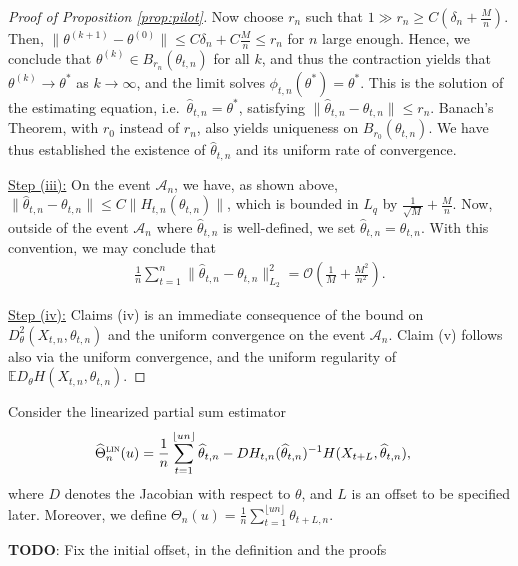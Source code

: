 \documentclass[10pt, a4paper]{article}
\theoremstyle{assumption}
\theoremstyle{definition}
\theoremstyle{theorem}
\newcommand{\E}{\mathbb{E}}
\begin{document}
\begin{proof}[Proof of Proposition \ref{prop:pilot}]
    Now choose $r_n$ such that $1\gg r_n \geq C(\delta_n + \frac{M}{n})$.
    Then, $\|\theta^{(k+1)} - \theta^{(0)}\|\leq C \delta_n + C\frac{M}{n}\leq r_n$ for $n$ large enough. 
    Hence, we conclude that $\theta^{(k)}\in B_{r_n}(\theta_{t,n})$ for all $k$, and thus the contraction yields that $\theta^{(k)}\to \theta^*$ as $k\to \infty$, and the limit solves $\phi_{t,n}(\theta^*)=\theta^*$.
    This is the solution of the estimating equation, i.e.\ $\widehat{\theta}_{t,n}=\theta^*$, satisfying $\|\widehat{\theta}_{t,n}-\theta_{t,n}\|\leq r_n$. 
    Banach's Theorem, with $r_0$ instead of $r_n$, also yields uniqueness on $B_{r_0}(\theta_{t,n})$.
    We have thus established the existence of $\widehat{\theta}_{t,n}$ and its uniform rate of convergence.

    \underline{Step (iii):}
    On the event $\mathcal{A}_n$, we have, as shown above, $\|\widehat{\theta}_{t,n}-\theta_{t,n}\| \leq C \| H_{t,n}(\theta_{t,n})\|$, which is bounded in $L_q$ by $\frac{1}{\sqrt{M}} + \frac{M}{n}$.
    Now, outside of the event $\mathcal{A}_n$ where $\widehat{\theta}_{t,n}$ is well-defined, we set $\widehat{\theta}_{t,n}=\theta_{t,n}$.
    With this convention, we may conclude that
    \begin{align*}
        \frac{1}{n}\sum_{t=1}^n \|\widehat{\theta}_{t,n}-\theta_{t,n}\|_{L_2}^2 = \mathcal{O}\left( \tfrac{1}{M} + \tfrac{M^2}{n^2} \right).
    \end{align*}
    
    \underline{Step (iv):}
    Claims (iv) is an immediate consequence of the bound on $D^2_\theta(X_{t,n}, \theta_{t,n})$ and the uniform convergence on the event $\mathcal{A}_n$. 
    Claim (v) follows also via the uniform convergence, and the uniform regularity of $\E D_\theta H(X_{t,n}, \theta_{t,n})$.
\end{proof}

Consider the linearized partial sum estimator
\begin{align*}
    \widehat{\Theta}_n^{\textsc{lin}}(u)
    &=\frac{1}{n} \sum_{t=1}^{\lfloor un \rfloor} \widehat{\theta}_{t,n} - DH_{t,n}(\widehat{\theta}_{t,n})^{-1} H(X_{t+L}, \widehat{\theta}_{t,n}) ,
\end{align*}
where $D$ denotes the Jacobian with respect to $\theta$, and $L$ is an offset to be specified later. 
Moreover, we define $\Theta_{n}(u) = \frac{1}{n} \sum_{t=1}^{\lfloor un\rfloor} \theta_{t+L,n}$.

\color{blue} \textbf{TODO}: Fix the initial offset, in the definition and the proofs \color{black}
\end{document}
